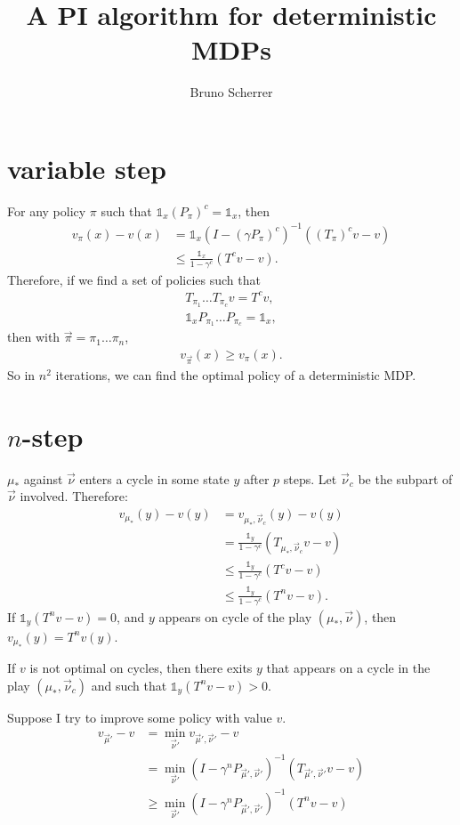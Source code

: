 \documentclass{article}
\title{A PI algorithm for deterministic MDPs}
\author{Bruno Scherrer}
\def\1{{\mathds 1}}
\begin{document}
\maketitle

\section{variable step}

For any policy $\pi$ such that $\1_x (P_{\pi})^c = \1_x$, then
\begin{align}
  v_{\pi}(x) - v(x) & = \1_x (I-(\gamma P_\pi)^c)^{-1} ((T_{\pi})^c v - v) \\
  & \le \frac{\1_x}{1-\gamma^c} (T^c v - v).
\end{align}
Therefore, if we find a set of policies such that
\begin{align}
  T_{\pi_1}\dots T_{\pi_c} v = T^c v,\\
  \1_x P_{\pi_1} \dots P_{\pi_c} = \1_x,
\end{align}
then with $\vec\pi=\pi_1 \dots \pi_n$,
\begin{align}
  v_{\vec\pi} (x) \ge v_{\pi}(x).
\end{align}
So in $n^2$ iterations, we can find the optimal policy of a deterministic MDP.

\section{$n$-step}

$\mu_*$ against $\vec\nu$ enters a cycle in some state $y$ after $p$ steps. Let $\vec\nu_c$ be the subpart of $\vec\nu$ involved. Therefore:
\begin{align}
  v_{\mu_*}(y)-v(y) &= v_{\mu_*,\vec\nu_c}(y) - v(y) \\
  & = \frac{\1_y}{1-\gamma^c}(T_{\mu_*,\vec\nu_c}v - v) \\
  & \le \frac{\1_y}{1-\gamma^c}(T^c v - v) \\
  & \le \frac{\1_y}{1-\gamma^c}(T^n v - v).
\end{align}
If $\1_y(T^n v - v) = 0$, and $y$ appears on cycle of the play $(\mu_*,\vec\nu)$, then $v_{\mu_*}(y)=T^n v(y)$.

If $v$ is not optimal on cycles, then there exits $y$ that appears on a cycle in the play $(\mu_*,\vec\nu_c)$ and such that $\1_y(T^n v - v)>0$.


Suppose I try to improve some policy with value $v$.
\begin{align}
  v_{\vec\mu'} - v & = \min_{\vec\nu'} v_{\vec\mu',\vec\nu'}-v \\
  & = \min_{\vec\nu'}(I-\gamma^n P_{\vec\mu',\vec\nu'})^{-1}(T_{\vec\mu',\vec\nu'}v - v) \\
  & \ge \min_{\vec\nu'}(I-\gamma^n P_{\vec\mu',\vec\nu'})^{-1}(T^n v - v)
\end{align}



\end{document}
